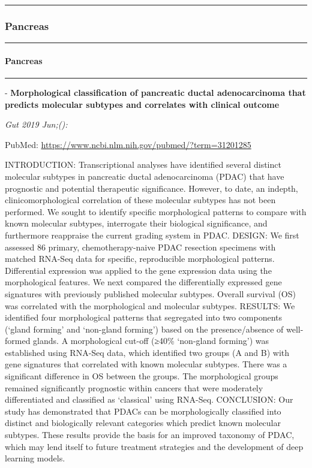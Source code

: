 \documentclass[]{article}
\let\oldparagraph\paragraph
\renewcommand{\paragraph}[1]{\oldparagraph{#1}\mbox{}}
\begin{document}
\begin{center}\rule{0.5\linewidth}{\linethickness}\end{center}

\hypertarget{pancreas-2}{%
\subsubsection{Pancreas}\label{pancreas-2}}

\begin{center}\rule{0.5\linewidth}{\linethickness}\end{center}

\hypertarget{pancreas-3}{%
\paragraph{Pancreas}\label{pancreas-3}}

\begin{center}\rule{0.5\linewidth}{\linethickness}\end{center}

 - \textbf{Morphological classification of pancreatic ductal
adenocarcinoma that predicts molecular subtypes and correlates with
clinical outcome}

\emph{Gut 2019 Jun;():}

PubMed: \url{https://www.ncbi.nlm.nih.gov/pubmed/?term=31201285}

INTRODUCTION: Transcriptional analyses have identified several distinct
molecular subtypes in pancreatic ductal adenocarcinoma (PDAC) that have
prognostic and potential therapeutic significance. However, to date, an
indepth, clinicomorphological correlation of these molecular subtypes
has not been performed. We sought to identify specific morphological
patterns to compare with known molecular subtypes, interrogate their
biological significance, and furthermore reappraise the current grading
system in PDAC. DESIGN: We first assessed 86 primary, chemotherapy-naive
PDAC resection specimens with matched RNA-Seq data for specific,
reproducible morphological patterns. Differential expression was applied
to the gene expression data using the morphological features. We next
compared the differentially expressed gene signatures with previously
published molecular subtypes. Overall survival (OS) was correlated with
the morphological and molecular subtypes. RESULTS: We identified four
morphological patterns that segregated into two components (`gland
forming' and `non-gland forming') based on the presence/absence of
well-formed glands. A morphological cut-off (≥40\% `non-gland forming')
was established using RNA-Seq data, which identified two groups (A and
B) with gene signatures that correlated with known molecular subtypes.
There was a significant difference in OS between the groups. The
morphological groups remained significantly prognostic within cancers
that were moderately differentiated and classified as `classical' using
RNA-Seq. CONCLUSION: Our study has demonstrated that PDACs can be
morphologically classified into distinct and biologically relevant
categories which predict known molecular subtypes. These results provide
the basis for an improved taxonomy of PDAC, which may lend itself to
future treatment strategies and the development of deep learning models.
\end{document}
